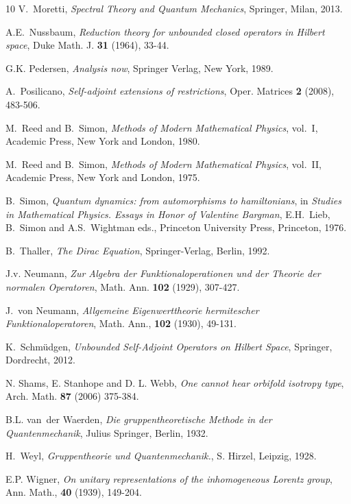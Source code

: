\documentclass[a4paper,12pt]{amsart}
\newcommand{\1}{\mathbb{I}}
\numberwithin{equation}{section}
\numberwithin{theorem}{section}
\begin{document}
\begin{thebibliography}{10}
{\sc V.~Moretti},
{\em Spectral Theory and Quantum Mechanics},
Springer, Milan, 2013.

{\sc A.E.~Nussbaum}, {\em Reduction theory for unbounded closed operators in Hilbert space},
Duke Math. J. {\bf 31} (1964), 33-44.

{\sc G.K. Pedersen}, {\em Analysis now},
  Springer Verlag, New York, 1989.

{\sc A.~Posilicano}, {\em Self-adjoint extensions of restrictions},
Oper. Matrices {\bf 2} (2008), 483-506.

{\sc M.~Reed and B.~Simon}, {\em Methods of Modern Mathematical Physics},
  vol.~I, Academic Press, New York {and} London, 1980.

{\sc M.~Reed and B.~Simon},
{\em Methods of Modern
  Mathematical Physics}, vol.~II, Academic Press, New York {and} London, 1975.

{\sc B.~Simon}, {\em Quantum dynamics: from automorphisms to hamiltonians}, in {\em Studies in
Mathematical Physics. Essays in Honor of Valentine Bargman}, E.H.~Lieb, B.~Simon and A.S.~Wightman
eds., Princeton University Press, Princeton, 1976.

{\sc B.~Thaller}, {\em The {D}irac Equation}, Springer-Verlag, Berlin, 1992.

{\sc J.v. Neumann}, {\em Zur Algebra der Funktionaloperationen und der Theorie der
  normalen Operatoren}, Math. Ann. \textbf{102} (1929), 307-427.

{\sc J.~{v}on Neumann}, {\em Allgemeine {E}igenwerttheorie hermitescher
  {F}unktionaloperatoren}, Math. Ann., {\bf 102} (1930), 49-131.

{\sc K.~Schm\"udgen}, {\em Unbounded Self-Adjoint Operators on Hilbert Space},
Springer, Dordrecht, 2012.

  {\sc N. Shams, E. Stanhope and D. L. Webb}, {\em One cannot hear orbifold isotropy type},
Arch. Math. {\bf 87} (2006) 375-384.

{\sc B.L. van~der Waerden}, {\em Die gruppentheoretische Methode in der
  Quantenmechanik}, Julius Springer, Berlin, 1932.

{\sc H.~Weyl}, {\em Gruppentheorie und Quantenmechanik.}, S. Hirzel, Leipzig, 1928.

{\sc E.P. Wigner}, {\em On unitary representations of the inhomogeneous {L}orentz
  group}, Ann. Math., {\bf 40} (1939), 149-204.


\end{thebibliography}
\end{document}
